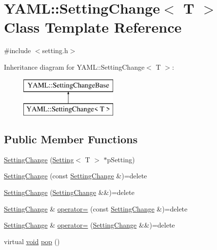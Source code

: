 \hypertarget{class_y_a_m_l_1_1_setting_change}{}\section{Y\+A\+ML\+::Setting\+Change$<$ T $>$ Class Template Reference}
\label{class_y_a_m_l_1_1_setting_change}


{\ttfamily \#include $<$setting.\+h$>$}

Inheritance diagram for Y\+A\+ML\+::Setting\+Change$<$ T $>$\+:\begin{figure}[H]
\begin{center}
\leavevmode
\includegraphics[height=2.000000cm]{class_y_a_m_l_1_1_setting_change}
\end{center}
\end{figure}
\subsection*{Public Member Functions}
\begin{DoxyCompactItemize}
\item 
\mbox{\hyperlink{class_y_a_m_l_1_1_setting_change_a93fc1771021b72f7dc2672d89aaae044}{Setting\+Change}} (\mbox{\hyperlink{class_y_a_m_l_1_1_setting}{Setting}}$<$ T $>$ $\ast$p\+Setting)
\item 
\mbox{\hyperlink{class_y_a_m_l_1_1_setting_change_a76d8b17ce29951b841b668b27e8306ac}{Setting\+Change}} (const \mbox{\hyperlink{class_y_a_m_l_1_1_setting_change}{Setting\+Change}} \&)=delete
\item 
\mbox{\hyperlink{class_y_a_m_l_1_1_setting_change_ac80eb138e4e7d2acabc44fe6badc2c24}{Setting\+Change}} (\mbox{\hyperlink{class_y_a_m_l_1_1_setting_change}{Setting\+Change}} \&\&)=delete
\item 
\mbox{\hyperlink{class_y_a_m_l_1_1_setting_change}{Setting\+Change}} \& \mbox{\hyperlink{class_y_a_m_l_1_1_setting_change_a8ad492499b6c81fc2d06b6e16f7d0343}{operator=}} (const \mbox{\hyperlink{class_y_a_m_l_1_1_setting_change}{Setting\+Change}} \&)=delete
\item 
\mbox{\hyperlink{class_y_a_m_l_1_1_setting_change}{Setting\+Change}} \& \mbox{\hyperlink{class_y_a_m_l_1_1_setting_change_a12adf18c935ea8c8c7f42d1e9a86cb20}{operator=}} (\mbox{\hyperlink{class_y_a_m_l_1_1_setting_change}{Setting\+Change}} \&\&)=delete
\item 
virtual \mbox{\hyperlink{glad_8h_a950fc91edb4504f62f1c577bf4727c29}{void}} \mbox{\hyperlink{class_y_a_m_l_1_1_setting_change_a6af6bc2842d1992e1320fdd3e4d5350e}{pop}} ()
\end{DoxyCompactItemize}


